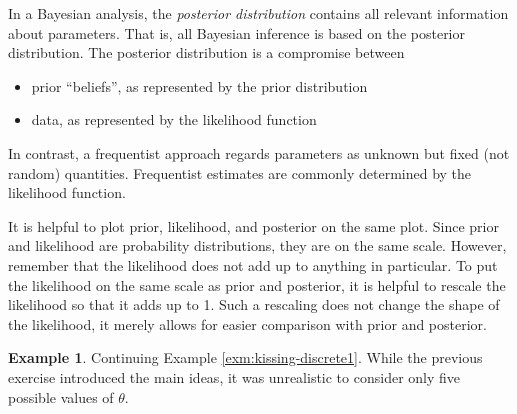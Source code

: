 \documentclass[
]{book}
\providecommand{\tightlist}{%
  \setlength{\itemsep}{0pt}\setlength{\parskip}{0pt}}
\theoremstyle{definition}
\theoremstyle{definition}
\newtheorem{example}{Example}[chapter]
\theoremstyle{definition}
\theoremstyle{remark}
\begin{document}
In a Bayesian analysis, the \emph{posterior distribution} contains all relevant information about parameters. That is, all Bayesian inference is based on the posterior distribution. The posterior distribution is a compromise between

\begin{itemize}
\tightlist
\item
  prior ``beliefs'', as represented by the prior distribution
\item
  data, as represented by the likelihood function
\end{itemize}

In contrast, a frequentist approach regards parameters as unknown but fixed (not random) quantities. Frequentist estimates are commonly determined by the likelihood function.

It is helpful to plot prior, likelihood, and posterior on the same plot. Since prior and likelihood are probability distributions, they are on the same scale. However, remember that the likelihood does not add up to anything in particular. To put the likelihood on the same scale as prior and posterior, it is helpful to rescale the likelihood so that it adds up to 1. Such a rescaling does not change the shape of the likelihood, it merely allows for easier comparison with prior and posterior.

\begin{example}
\protect\hypertarget{exm:kissing-discrete2}{}{\label{exm:kissing-discrete2} }
Continuing Example \ref{exm:kissing-discrete1}. While the previous exercise introduced the main ideas, it was unrealistic to consider only five possible values of \(\theta\).
\end{example}
\end{document}
